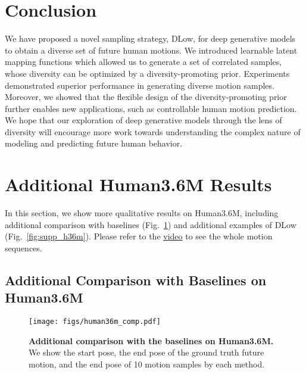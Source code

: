 \documentclass[runningheads]{llncs}
\begin{document}
	\vspace{-2mm}
	\section{Conclusion}
	\vspace{-1mm}
	We have proposed a novel sampling strategy, DLow, for deep generative models to obtain a diverse set of future human motions. We introduced learnable latent mapping functions which allowed us to generate a set of correlated samples, whose diversity can be optimized by a diversity-promoting prior. Experiments demonstrated superior performance in generating diverse motion samples. Moreover, we showed that the flexible design of the diversity-promoting prior further enables new applications, such as controllable human motion prediction. We hope that our exploration of deep generative models through the lens of diversity will encourage more work towards understanding the complex nature of modeling and predicting future human behavior.
	
	
	
	
	
	\appendix
	
\clearpage
\section{Additional Human3.6M Results}
In this section, we show more qualitative results on Human3.6M, including additional comparison with baselines (Fig.~\ref{fig:supp_h36m_comp}) and additional examples of DLow (Fig.~\ref{fig:supp_h36m}). Please refer to the \href{https://youtu.be/64OEdSadb00}{video} to see the whole motion sequences.
\vspace{-3mm}
\subsection{Additional Comparison with Baselines on Human3.6M}
\begin{figure}[ht!]
    \vspace{-7mm}
    \centering
    \texttt{[image: figs/human36m\_comp.pdf]}
    \vspace{-5mm}
    \caption{\textbf{Additional comparison with the baselines on Human3.6M.} We show the start pose, the end pose of the ground truth future motion, and the end pose of 10 motion samples by each method.}
    \label{fig:supp_h36m_comp}
\end{figure}

\clearpage
\end{document}
